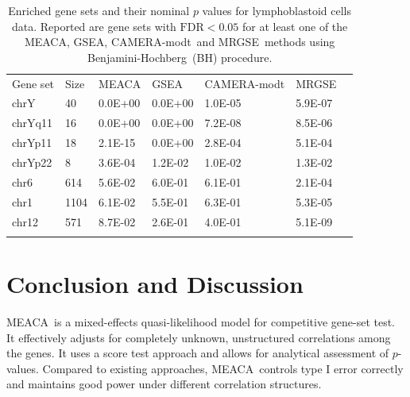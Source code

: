 \documentclass[a4,center,fleqn]{NAR}
\newcommand{\OurMethod}{MEACA}
\newcommand{\CMT}{CAMERA-modt}
\newcommand{\genr}{MRGSE}
\newcommand{\FDR}{Benjamini-Hochberg}
\newcommand{\FDRabb}{BH}
\begin{document}
	\begin{table}[!ht]
		\centering
		\caption[Enriched gene sets and their nominal $p$ values for lymphoblastoid cells 
		data]{Enriched gene sets and their nominal $p$ values for lymphoblastoid cells data. 
			Reported are gene sets with $\text{FDR}<0.05$ for at least one of the \OurMethod, GSEA, 
			\CMT~and \genr~methods using \FDR~(\FDRabb) procedure.}
	\begin{tabular}{p{3cm}p{1cm}p{3cm}p{2cm}p{3cm}p{2cm}p{2cm}} \toprule
			Gene set & Size & \OurMethod & GSEA & \CMT & \genr \\ 		\colrule
			chrY & 40 & 0.0E+00 & 0.0E+00 & 1.0E-05 & 5.9E-07 \\ 
			chrYq11 & 16 & 0.0E+00 & 0.0E+00 & 7.2E-08 & 8.5E-06 \\ 
			chrYp11 & 18 & 2.1E-15 & 0.0E+00 & 2.8E-04 & 5.1E-04 \\ 
			chrYp22 & 8 & 3.6E-04 & 1.2E-02 & 1.0E-02 & 1.3E-02 \\ 
			chr6 & 614 & 5.6E-02 & 6.0E-01 & 6.1E-01 & 2.1E-04 \\ 
			chr1 & 1104 & 6.1E-02 & 5.5E-01 & 6.3E-01 & 5.3E-05 \\ 
			chr12 & 571 & 8.7E-02 & 2.6E-01 & 4.0E-01 & 5.1E-09 \\ 
			\botrule
		\end{tabular}
		\label{table:gender}
	\end{table}
	
	\section{Conclusion and Discussion}\label{section:conclusion}
	
	 \OurMethod~is a mixed-effects quasi-likelihood model for competitive gene-set 
	 test. It effectively adjusts for completely unknown, unstructured correlations among the 
	 genes. It uses a score test approach and allows for analytical assessment of $p$-values. 
	 Compared to existing approaches, \OurMethod~controls type I error correctly and maintains good 
	 power under different correlation structures.  
	 
\end{document}
